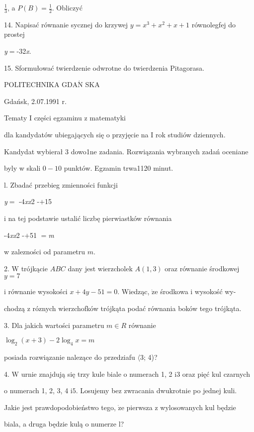 \documentclass[a4paper,12pt]{article}
\begin{document}
$\displaystyle \frac{1}{3}$, a $P(B) = \displaystyle \frac{1}{2}$. Obliczyć

14. Napisać równanie sycznej do krzywej $y=x^{3}+x^{2}+x+1$ równolegfej do prostej

{\it y}$=$-32{\it x}.

15. Sformułować twierdzenie odwrotne do twierdzenia Pitagorasa.






POLITECHNIKA $\mathrm{G}\mathrm{D}\mathrm{A}\acute{\mathrm{N}}$ SKA

Gdańsk, 2.07.1991 r.

Tematy I części egzaminu z matematyki

dla kandydatów ubiegających się o przyjęcie na I rok studiów dziennych.

Kandydat wybierał 3 dowo1ne zadania. Rozwiązania wybranych zadań oceniane

byly w skali $0-10$ punktów. Egzamin trwa1120 minut.

l. Zbadać przebieg zmienności funkcji

{\it y}$=$ -4{\it xx}2 -$+$15

i na tej podstawie ustalić liczbę pierwiastków równania

-4{\it xx}2 -$+$51 $=${\it m}

w zalezności od parametru $m.$

2. $\mathrm{W}$ trójkącie $ABC$ dany jest wierzcholek $A(1,3)$ oraz równanie środkowej $y=7$

i równanie wysokości $x+4y-51=0$. Wiedząc, $\dot{\mathrm{z}}\mathrm{e}$ środkowa i wysokość wy-

chodzą z róznych wierzchofków trójkąta podać równania boków tego trójkąta.

3. Dla jakich wartości parametru $m\in R$ równanie

$\log_{2}(x+3)-2\log_{4}x=m$

posiada rozwiązanie nalezące do przedziafu $\langle$3; 4)?

4. $\mathrm{W}$ urnie znajdują się trzy kule biale o numerach 1, 2 $\mathrm{i}3$ oraz pięć kul czarnych

o numerach 1, 2, 3, 4 $\mathrm{i}5$. Losujemy bez zwracania dwukrotnie po jednej kuli.

Jakie jest prawdopodobieństwo tego, $\dot{\mathrm{z}}\mathrm{e}$ pierwsza z wylosowanych kul będzie

biala, a druga będzie kulą o numerze l?
\end{document}
